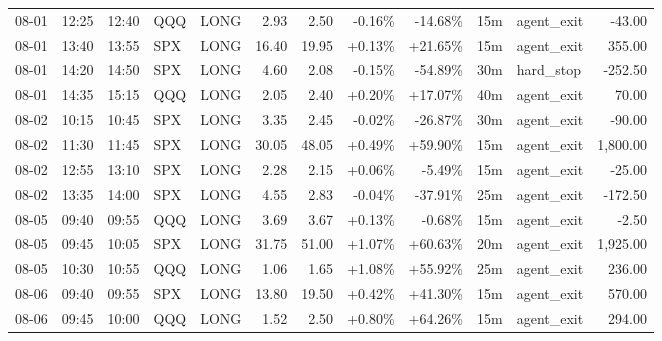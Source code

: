 \documentclass[11pt,a4paper]{article}
\begin{document}
\begin{center}
\begin{longtable}{>{\color{txtmain}}l l l l l r r r r r >{\color{txtmain}}l r}
08-01 & 12:25 & 12:40 & QQQ & LONG & 2.93 & 2.50 & \textcolor{lossred}{-0.16\%} & \textcolor{lossred}{-14.68\%} & 15m & agent\_exit & \textcolor{lossred}{-43.00} \\
08-01 & 13:40 & 13:55 & SPX & LONG & 16.40 & 19.95 & \textcolor{wingreen}{+0.13\%} & \textcolor{wingreen}{+21.65\%} & 15m & agent\_exit & \textcolor{wingreen}{355.00} \\
08-01 & 14:20 & 14:50 & SPX & LONG & 4.60 & 2.08 & \textcolor{lossred}{-0.15\%} & \textcolor{lossred}{-54.89\%} & 30m & hard\_stop & \textcolor{lossred}{-252.50} \\
08-01 & 14:35 & 15:15 & QQQ & LONG & 2.05 & 2.40 & \textcolor{wingreen}{+0.20\%} & \textcolor{wingreen}{+17.07\%} & 40m & agent\_exit & \textcolor{wingreen}{70.00} \\
08-02 & 10:15 & 10:45 & SPX & LONG & 3.35 & 2.45 & \textcolor{lossred}{-0.02\%} & \textcolor{lossred}{-26.87\%} & 30m & agent\_exit & \textcolor{lossred}{-90.00} \\
08-02 & 11:30 & 11:45 & SPX & LONG & 30.05 & 48.05 & \textcolor{wingreen}{+0.49\%} & \textcolor{wingreen}{+59.90\%} & 15m & agent\_exit & \textcolor{wingreen}{1,800.00} \\
08-02 & 12:55 & 13:10 & SPX & LONG & 2.28 & 2.15 & \textcolor{wingreen}{+0.06\%} & \textcolor{lossred}{-5.49\%} & 15m & agent\_exit & \textcolor{lossred}{-25.00} \\
08-02 & 13:35 & 14:00 & SPX & LONG & 4.55 & 2.83 & \textcolor{lossred}{-0.04\%} & \textcolor{lossred}{-37.91\%} & 25m & agent\_exit & \textcolor{lossred}{-172.50} \\
08-05 & 09:40 & 09:55 & QQQ & LONG & 3.69 & 3.67 & \textcolor{wingreen}{+0.13\%} & \textcolor{lossred}{-0.68\%} & 15m & agent\_exit & \textcolor{lossred}{-2.50} \\
08-05 & 09:45 & 10:05 & SPX & LONG & 31.75 & 51.00 & \textcolor{wingreen}{+1.07\%} & \textcolor{wingreen}{+60.63\%} & 20m & agent\_exit & \textcolor{wingreen}{1,925.00} \\
08-05 & 10:30 & 10:55 & QQQ & LONG & 1.06 & 1.65 & \textcolor{wingreen}{+1.08\%} & \textcolor{wingreen}{+55.92\%} & 25m & agent\_exit & \textcolor{wingreen}{236.00} \\
08-06 & 09:40 & 09:55 & SPX & LONG & 13.80 & 19.50 & \textcolor{wingreen}{+0.42\%} & \textcolor{wingreen}{+41.30\%} & 15m & agent\_exit & \textcolor{wingreen}{570.00} \\
08-06 & 09:45 & 10:00 & QQQ & LONG & 1.52 & 2.50 & \textcolor{wingreen}{+0.80\%} & \textcolor{wingreen}{+64.26\%} & 15m & agent\_exit & \textcolor{wingreen}{294.00} \\

\end{longtable}
\end{center}
\end{document}
